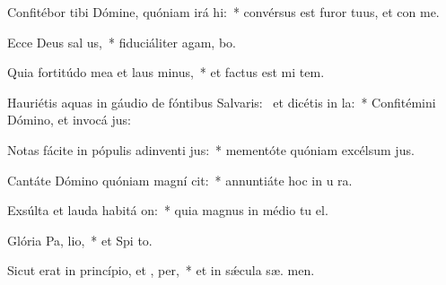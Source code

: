 \item Confitébor tibi Dómine, quóniam irá  hi:~* convérsus est furor tuus, et con  me.
\item Ecce Deus sal us,~* fiduciáliter agam,   bo.
\item Quia fortitúdo mea et laus  minus,~* et factus est mi  tem.
\item Hauriétis aquas in gáudio de fóntibus Salvaris:~\pscross{} et dicétis in  la:~* Confitémini Dómino, et invocá  jus:
\item Notas fácite in pópulis adinventi jus:~* mementóte quóniam excélsum   jus.
\item Cantáte Dómino quóniam magní cit:~* annuntiáte hoc in u ra.
\item Exsúlta et lauda habitá on:~* quia magnus in médio tu  el.
\item Glória Pa,  lio,~* et Spi to.
\item Sicut erat in princípio, et ,  per,~* et in sǽcula sæ. men.
